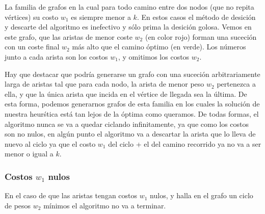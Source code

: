 La familia de grafos en la cual para todo camino entre dos nodos (que no repita v\'ertices) su costo $w_1$ es siempre menor a $k$. En estos casos el m\'etodo de desici\'on y descarte del algoritmo es inefectivo y s\'olo prima la desici\'on golosa. Vemos en este grafo, que las aristas de menor coste $w_2$ (en color rojo) forman una suceci\'on con un coste final $w_2$ m\'as alto que el camino \'optimo (en verde). Los n\'umeros junto a cada arista son los costos $w_1$, y omitimos los costos $w_2$.

\vspace{2mm}

Hay que destacar que podr\'ia generarse un grafo con una suceci\'on arbitrariamente larga de aristas tal que para cada nodo, la arista de menor peso $w_2$ pertenezca a ella, y que la \'unica arista que incida en el v\'ertice de llegada sea la \'ultima. De esta forma, podemos generarnos grafos de esta familia en los cuales la soluci\'on de nuestra heur\'stica est\'a tan lejos de la \'optima como queramos. De todas formas, el algoritmo nunca se va a quedar ciclando infinitamente, ya que como los costos son no nulos, en alg\'un punto el algoritmo va a descartar la arista que lo lleva de nuevo al ciclo ya que el costo $w_1$ del ciclo + el del camino recorrido ya no va a ser menor o igual a $k$.

\subsubsection{Costos $w_1$ nulos}

En el caso de que las aristas tengan costos $w_1$ nulos, y halla en el grafo un ciclo de pesos $w_2$ m\'inimos el algoritmo no va a terminar.	
